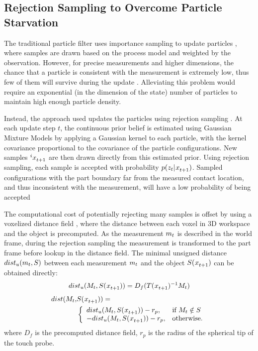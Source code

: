 \documentclass[../thesis.tex]{subfiles}
\begin{document}
\subsection{Rejection Sampling to Overcome Particle Starvation}
  
The traditional particle filter uses importance sampling to update particles \cite{Thrun2000}, where samples are drawn based on the process model and weighted by the observation. However, for precise measurements and higher dimensions, the chance that a particle is consistent with the measurement is extremely low, thus few of them will survive during the update \cite{Koval2013}. 
Alleviating this problem would require an exponential (in the dimension of the state) number of particles to maintain high enough particle density.

Instead, the approach used updates the particles using rejection sampling \cite{Saund2017}. At each update step $t$, the continuous prior belief is estimated using Gaussian Mixture Models by applying a Gaussian kernel to each particle, with the kernel covariance proportional to the covariance of the particle configurations. 
New samples $\particle[t+1][i]$ are then drawn directly from this estimated prior. 
Using rejection sampling, each sample is accepted with probability $p(z_t|\particle[t+1])$. 
Sampled configurations with the part boundary far from the measured contact location, and thus inconsistent with the measurement, will have a low probability of being accepted

The computational cost of potentially rejecting many samples is offset by using a voxelized distance field \cite{Felzenszwalb2004}, where the distance between each voxel in 3D workspace and the object is precomputed. 
As the measurement $m_t$ is described in the world frame, during the rejection sampling the measurement is transformed to the part frame before lookup in the distance field.
The minimal unsigned distance $dist_u(m_t,S)$ between each measurement $m_t$ and the object $S(\particle[t+1])$ can be obtained directly\cite{Saund2017}: 
\begin{align}\label{eq:unsigned}
dist_u(M_t,S(\particle[t+1])) = D_f(T(\particle[t+1])^{-1}M_t)
\end{align}
\begin{align}\label{eq:signed}
dist(M_t,&S(\particle[t+1])) =\\
 &\left\{
\begin{array}{ll}
dist_u(M_t,S(\particle[t+1])) - r_p, & \text{if }M_t\notin S\\
-dist_u(M_t,S(\particle[t+1])) - r_p, & \text{otherwise}.
\end{array}
\right.
\end{align}  
where $D_f$ is the precomputed distance field, $r_p$ is the radius of the spherical tip of the touch probe. 
\end{document}
